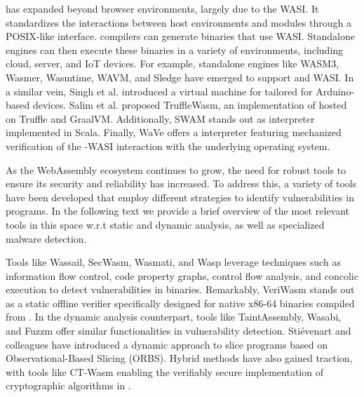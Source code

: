  \wasm has expanded beyond browser environments, largely due to the WASI\cite{WASI}. 
It standardizes the interactions between host environments and \Wasm modules through a POSIX-like interface.
\wasm compilers can generate binaries that use WASI.
Standalone engines can then execute these binaries in a variety of environments, including cloud, server, and IoT devices.
For example, standalone engines like WASM3, Wasmer, Wasmtime, WAVM, and Sledge\cite{Sledge} have emerged to support \Wasm and WASI. 
In a similar vein, Singh et al.\cite{WARDuino2019} introduced a virtual machine for \Wasm tailored for Arduino-based devices. 
Salim et al.\cite{trufflewasm} proposed TruffleWasm, an implementation of \Wasm hosted on Truffle and GraalVM. 
Additionally, SWAM stands out as \Wasm interpreter implemented in Scala. 
Finally, WaVe\cite{wave} offers a \Wasm interpreter featuring mechanized verification of the \Wasm-WASI interaction with the underlying operating system.



\label{background:wasm:analysis}
As the WebAssembly ecosystem continues to grow, the need for robust tools to ensure its security and reliability has increased. 
To address this, a variety of tools have been developed that employ different strategies to identify vulnerabilities in \Wasm programs. 
In the following text we provide a brief overview of the most relevant tools in this space w.r.t static and dynamic analysis, as well as specialized malware detection.

\vspace{10mm}
Tools like Wassail\cite{wassail}, SecWasm\cite{secwasm}, Wasmati\cite{wasmati}, and Wasp\cite{Wasp} leverage techniques such as information flow control, code property graphs, control flow analysis, and concolic execution to detect vulnerabilities in \wasm binaries. 
Remarkably, VeriWasm\cite{veriwasm} stands out as a static offline verifier specifically designed for native x86-64 binaries compiled from \Wasm. 
In the dynamic analysis counterpart, tools like TaintAssembly\cite{taintassembly}, Wasabi\cite{wasabi}, and Fuzzm\cite{fuzzm} offer similar functionalities in vulnerability detection. 
Stiévenart and colleagues have introduced a dynamic approach to slice \Wasm programs based on Observational-Based Slicing (ORBS)\cite{slicing, slicing2}. 
Hybrid methods have also gained traction, with tools like CT-Wasm\cite{ctwasm} enabling the verifiably secure implementation of cryptographic algorithms in \Wasm. 


